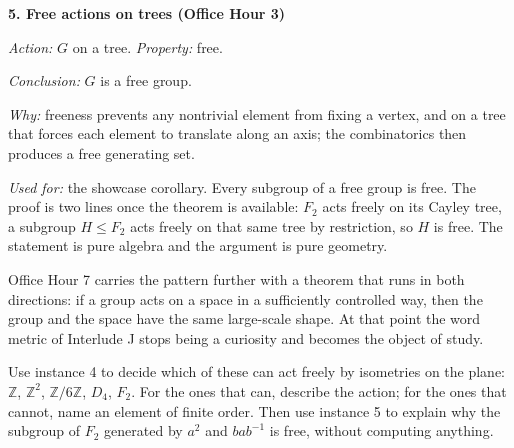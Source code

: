 \documentclass[10pt]{article}
\newcommand{\Z}{\mathbb{Z}}
\newcommand{\inv}{^{-1}}
\begin{document}
{\begin{minipage}[t]{744pt}
\begin{minipage}[t]{360pt}
{\sffamily\bfseries\color{big} 5. Free actions on trees (Office Hour 3)}\par\vspace{1pt}
\emph{Action:} $G$ on a tree. \emph{Property:} free.\par
\emph{Conclusion:} $G$ is a free group.\par
\emph{Why:} freeness prevents any nontrivial element from fixing a vertex, and on a tree that forces each element to translate along an axis; the combinatorics then produces a free generating set.\par\vspace{2pt}
\emph{Used for:} the showcase corollary. Every subgroup of a free group is free. The proof is two lines once the theorem is available: $F_2$ acts freely on its Cayley tree, a subgroup $H\le F_2$ acts freely on that same tree by restriction, so $H$ is free. The statement is pure algebra and the argument is pure geometry.\par\vspace{4pt}
\begin{lookahead}
Office Hour 7 carries the pattern further with a theorem that runs in both directions: if a group acts on a space in a sufficiently controlled way, then the group and the space have the same large-scale shape. At that point the word metric of Interlude J stops being a curiosity and becomes the object of study.
\end{lookahead}
\begin{tryit}
Use instance 4 to decide which of these can act freely by isometries on the plane: $\Z$, $\Z^2$, $\Z/6\Z$, $D_4$, $F_2$. For the ones that can, describe the action; for the ones that cannot, name an element of finite order. Then use instance 5 to explain why the subgroup of $F_2$ generated by $a^2$ and $bab\inv$ is free, without computing anything.
\end{tryit}
\end{minipage}
\end{minipage}
}
\end{document}
